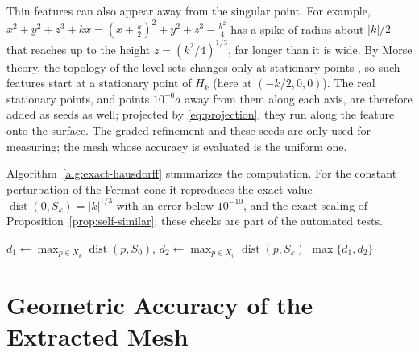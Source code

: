 Thin features can also appear away from the singular point. For example,
$x^2+y^2+z^3+kx=(x+\tfrac k2)^2+y^2+z^3-\tfrac{k^2}{4}$ has a spike of radius
about $|k|/2$ that reaches up to the height $z=(k^2/4)^{1/3}$, far longer than
it is wide. By Morse theory, the topology of the level sets changes only at
stationary points \cite{milnor1963morse}, so such features start at a
stationary point of $H_k$ (here at $(-k/2,0,0)$). The real stationary points,
and points $10^{-6}a$ away from them along each axis, are therefore added as
seeds as well; projected by \eqref{eq:projection}, they run along the feature
onto the surface. The graded refinement and these seeds are only used for
measuring; the mesh whose accuracy is evaluated is the uniform one.

Algorithm~\ref{alg:exact-hausdorff} summarizes the computation. For the
constant perturbation of the Fermat cone it reproduces the exact value
$\operatorname{dist}(0,S_k)=|k|^{1/3}$ with an error below $10^{-10}$, and the
exact scaling of Proposition~\ref{prop:self-similar}; these checks are part of
the automated tests.

\begin{algorithm}[!h]
\caption{Local Hausdorff distance between the exact surfaces $S_k$ and $S_0$}
\label{alg:exact-hausdorff}
$d_1\leftarrow\max_{p\in X_k}\operatorname{dist}(p,S_0)$, \quad $d_2\leftarrow\max_{p\in X_0}\operatorname{dist}(p,S_k)$
\Return $\max\{d_1,d_2\}$\;
\end{algorithm}

\section{Geometric Accuracy of the Extracted Mesh}
\label{sec:method-accuracy}

